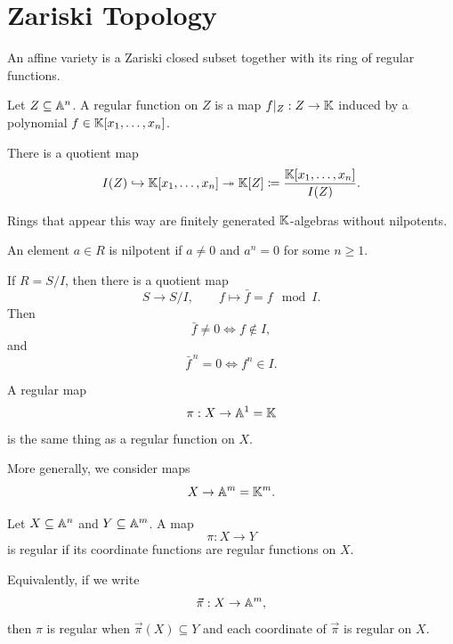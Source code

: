 
\section{Zariski Topology}

\begin{lemma*}{
    An affine variety is a Zariski closed subset together with its ring of regular functions.
}
\end{lemma*}

\begin{definition}
    Let $Z\subseteq \aa^n$.
    A regular function on $Z$ is a map $f|_Z : Z\to \kk$ induced by a polynomial $f\in \kk[x_1,\ldots,x_n]$.

    There is a quotient map
    \[
        I(Z)\hookrightarrow \kk[x_1,\ldots,x_n]\twoheadrightarrow \kk[Z] \coloneqq \frac{\kk[x_1,\ldots,x_n]}{I(Z)}.
    \]
\end{definition}

Rings that appear this way are finitely generated $\kk$-algebras without nilpotents.

\begin{definition}[Nilpotence]
    An element $a\in R$ is nilpotent if $a\neq 0$ and $a^n = 0$ for some $n\geq 1$.
\end{definition}

If $R = S/I$, then there is a quotient map
\[
    S\to S/I,\qquad f\mapsto \bar{f} = f \mod I.
\]
Then
\[
    \bar{f}\neq 0 \iff f\notin I,
\]
and
\[
    \bar{f}^{\,n} = 0 \iff f^n\in I.
\]

\begin{definition}
    A regular map
    \[
        \pi : X\to \aa^1 = \kk
    \]
    is the same thing as a regular function on $X$.

    More generally, we consider maps
    \[
        X\to \aa^m = \kk^m.
    \]
\end{definition}

\begin{definition}
    Let $X\subseteq \aa^n$ and $Y\subseteq \aa^m$.
    A map
    \[
        \pi : X\to Y
    \]
    is regular if its coordinate functions are regular functions on $X$.

    Equivalently, if we write
    \[
        \vec{\pi} : X\to \aa^m,
    \]
    then $\pi$ is regular when $\vec{\pi}(X)\subseteq Y$ and each coordinate of $\vec{\pi}$ is regular on $X$.
\end{definition}

